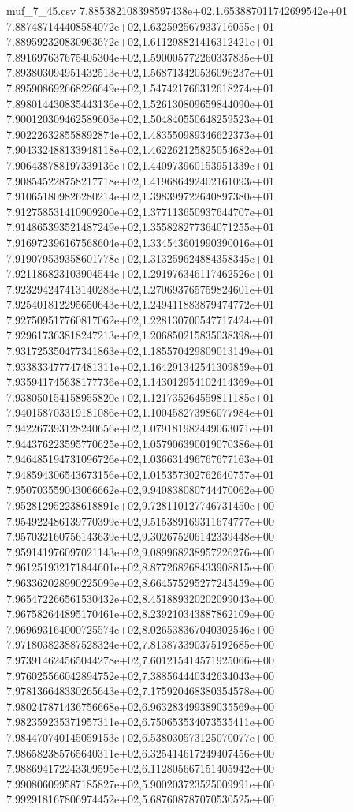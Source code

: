 \begin{filecontents*}{muf_7_45.csv}
7.885382108398597438e+02,1.653887011742699542e+01
7.887487144408584072e+02,1.632592567933716055e+01
7.889592320830963672e+02,1.611298821416312421e+01
7.891697637675405304e+02,1.590005772260337835e+01
7.893803094951432513e+02,1.568713420536096237e+01
7.895908692668226649e+02,1.547421766312618274e+01
7.898014430835443136e+02,1.526130809659844090e+01
7.900120309462589603e+02,1.504840550648259523e+01
7.902226328558892874e+02,1.483550989346622373e+01
7.904332488133948118e+02,1.462262125825054682e+01
7.906438788197339136e+02,1.440973960153951339e+01
7.908545228758217718e+02,1.419686492402161093e+01
7.910651809826280214e+02,1.398399722640897380e+01
7.912758531410909200e+02,1.377113650937644707e+01
7.914865393521487249e+02,1.355828277364071255e+01
7.916972396167568604e+02,1.334543601990390016e+01
7.919079539358601778e+02,1.313259624884358345e+01
7.921186823103904544e+02,1.291976346117462526e+01
7.923294247413140283e+02,1.270693765759824601e+01
7.925401812295650643e+02,1.249411883879474772e+01
7.927509517760817062e+02,1.228130700547717424e+01
7.929617363818247213e+02,1.206850215835038398e+01
7.931725350477341863e+02,1.185570429809013149e+01
7.933833477747481311e+02,1.164291342541309859e+01
7.935941745638177736e+02,1.143012954102414369e+01
7.938050154158955820e+02,1.121735264559811185e+01
7.940158703319181086e+02,1.100458273986077984e+01
7.942267393128240656e+02,1.079181982449063071e+01
7.944376223595770625e+02,1.057906390019070386e+01
7.946485194731096726e+02,1.036631496767677163e+01
7.948594306543673156e+02,1.015357302762640757e+01
7.950703559043066662e+02,9.940838080744470062e+00
7.952812952238618891e+02,9.728110127746731450e+00
7.954922486139770399e+02,9.515389169311674777e+00
7.957032160756143639e+02,9.302675206142339448e+00
7.959141976097021143e+02,9.089968238957226276e+00
7.961251932171844601e+02,8.877268268433908815e+00
7.963362028990225099e+02,8.664575295277245459e+00
7.965472266561530432e+02,8.451889320202099043e+00
7.967582644895170461e+02,8.239210343887862109e+00
7.969693164000725574e+02,8.026538367040302546e+00
7.971803823887528324e+02,7.813873390375192685e+00
7.973914624565044278e+02,7.601215414571925066e+00
7.976025566042894752e+02,7.388564440342634043e+00
7.978136648330265643e+02,7.175920468380354578e+00
7.980247871436756668e+02,6.963283499389035569e+00
7.982359235371957311e+02,6.750653534073535411e+00
7.984470740145059153e+02,6.538030573125070077e+00
7.986582385765640311e+02,6.325414617249407456e+00
7.988694172243309595e+02,6.112805667151405942e+00
7.990806099587185827e+02,5.900203723525009991e+00
7.992918167806974452e+02,5.687608787070530525e+00

\end{filecontents*}
